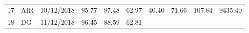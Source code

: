 \documentclass[
  11pt,
]{article}
\begin{document}
\begin{longtable}[]{@{}llllllllll@{}}
\begin{minipage}[t]{0.04\columnwidth}\raggedright
17\strut
\end{minipage} & \begin{minipage}[t]{0.09\columnwidth}\raggedright
AIR\strut
\end{minipage} & \begin{minipage}[t]{0.10\columnwidth}\raggedright
10/12/2018\strut
\end{minipage} & \begin{minipage}[t]{0.06\columnwidth}\raggedright
95.77\strut
\end{minipage} & \begin{minipage}[t]{0.06\columnwidth}\raggedright
87.48\strut
\end{minipage} & \begin{minipage}[t]{0.06\columnwidth}\raggedright
62.97\strut
\end{minipage} & \begin{minipage}[t]{0.06\columnwidth}\raggedright
40.40\strut
\end{minipage} & \begin{minipage}[t]{0.06\columnwidth}\raggedright
71.66\strut
\end{minipage} & \begin{minipage}[t]{0.13\columnwidth}\raggedright
107.84\strut
\end{minipage} & \begin{minipage}[t]{0.08\columnwidth}\raggedright
9435.40\strut
\end{minipage}\tabularnewline
\begin{minipage}[t]{0.04\columnwidth}\raggedright
18\strut
\end{minipage} & \begin{minipage}[t]{0.09\columnwidth}\raggedright
DG\strut
\end{minipage} & \begin{minipage}[t]{0.10\columnwidth}\raggedright
11/12/2018\strut
\end{minipage} & \begin{minipage}[t]{0.06\columnwidth}\raggedright
96.45\strut
\end{minipage} & \begin{minipage}[t]{0.06\columnwidth}\raggedright
88.59\strut
\end{minipage} & \begin{minipage}[t]{0.06\columnwidth}\raggedright
62.81\strut
\end{minipage} & \begin{minipage}[t]{0.06\columnwidth}\raggedright

\end{minipage}
\end{longtable}
\end{document}
